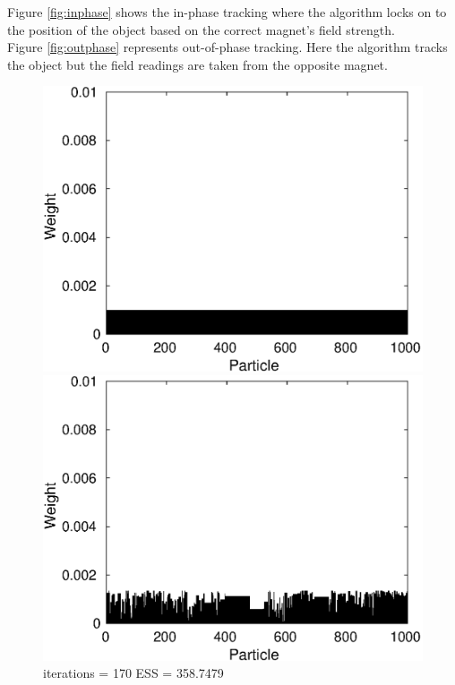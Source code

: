 \documentclass[12pt]{article}
\begin{document}
Figure \ref{fig:inphase} shows the in-phase tracking where the algorithm locks on to the position of the object based on the correct magnet's field strength.\\
Figure \ref{fig:outphase} represents out-of-phase tracking. Here the algorithm tracks the object but the field readings are taken from the opposite magnet. 
\newpage
\begin{figure}[h!]
\centering
	\begin{minipage}{0.5\textwidth}
		\centering
		\includegraphics[scale = 0.5]{./Figures/170resampled.eps}
		\caption*{iterations = 170 ESS = 358.7479}
	\end{minipage}%
	\begin{minipage}{0.5\textwidth}
		\centering
		\includegraphics[scale = 0.5]{./Figures/171.eps}

\end{minipage}
\end{figure}
\end{document}
